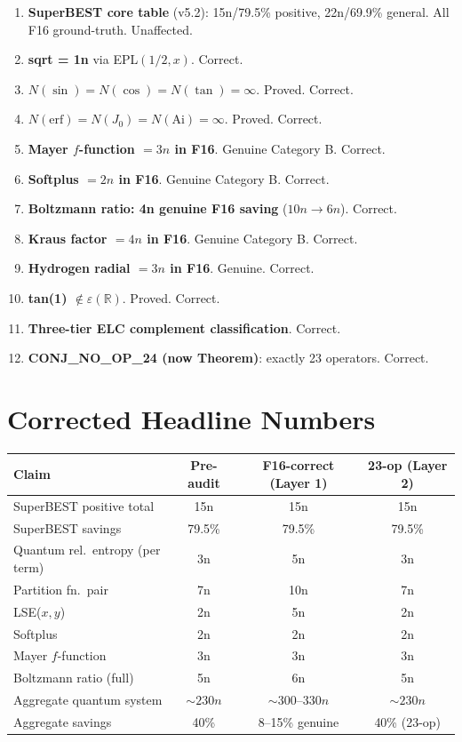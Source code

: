 \documentclass[11pt]{article}
\begin{document}
\begin{enumerate}
  \item \textbf{SuperBEST core table} (v5.2): 15n/79.5\% positive, 22n/69.9\% general.
    All F16 ground-truth. Unaffected.
  \item \textbf{sqrt = 1n} via EPL$(1/2, x)$. Correct.
  \item \textbf{$N(\sin) = N(\cos) = N(\tan) = \infty$}. Proved. Correct.
  \item \textbf{$N(\mathrm{erf}) = N(J_0) = N(\mathrm{Ai}) = \infty$}. Proved. Correct.
  \item \textbf{Mayer $f$-function $= 3n$ in F16}. Genuine Category B. Correct.
  \item \textbf{Softplus $= 2n$ in F16}. Genuine Category B. Correct.
  \item \textbf{Boltzmann ratio: 4n genuine F16 saving} ($10n \to 6n$). Correct.
  \item \textbf{Kraus factor $= 4n$ in F16}. Genuine Category B. Correct.
  \item \textbf{Hydrogen radial $= 3n$ in F16}. Genuine. Correct.
  \item \textbf{tan(1) $\notin \varepsilon(\mathbb{R})$}. Proved. Correct.
  \item \textbf{Three-tier ELC complement classification}. Correct.
  \item \textbf{CONJ\_NO\_OP\_24 (now Theorem)}: exactly 23 operators. Correct.
\end{enumerate}

\section{Corrected Headline Numbers}

\begin{center}
\renewcommand{\arraystretch}{1.3}
\begin{tabular}{lccc}
\toprule
Claim & Pre-audit & F16-correct (Layer 1) & 23-op (Layer 2) \\
\midrule
SuperBEST positive total & 15n & 15n & 15n \\
SuperBEST savings & 79.5\% & 79.5\% & 79.5\% \\
Quantum rel.\ entropy (per term) & 3n & 5n & 3n \\
Partition fn.\ pair & 7n & 10n & 7n \\
LSE($x,y$) & 2n & 5n & 2n \\
Softplus & 2n & 2n & 2n \\
Mayer $f$-function & 3n & 3n & 3n \\
Boltzmann ratio (full) & 5n & 6n & 5n \\
Aggregate quantum system & $\sim 230n$ & $\sim 300$--$330n$ & $\sim 230n$ \\
Aggregate savings & 40\% & 8--15\% genuine & 40\% (23-op) \\
\bottomrule
\end{tabular}
\end{center}
\end{document}
